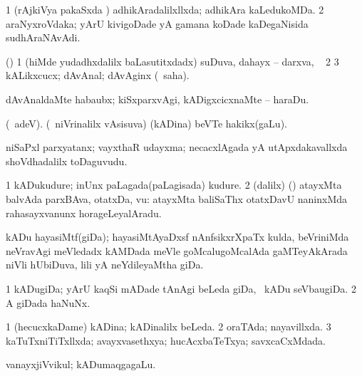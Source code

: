 {{{{{{\noindent
\gl{\pagu}
\expl{}
\bmng
\bnum
\num{1}  (rAjkiVya pakaSxda \vi) adhikAradalilxllxda; adhikAra kaLedukoMDa. 
\num{2}  araNyxroVdaka; yArU kivigoDade yA gamana koDade kaDegaNisida sudhAraNAvAdi. 
\enum
\emng
\eentry

\bentry
{} 
\gl{\nA}
\expl{}
\bmng
(\ca) 
\bnum
\num{1} (hiMde yudadhxdalilx baLasutitxdadx) suDuva, dahayx -- darxva, \kanmu\  
\num{2} 
\num{3} kALikxcucx; dAvAnal; dAvAginx (\rUpa\ saha). 
\enum
\emng

\noindent
\gl{\pagu}
\bmng
{} dAvAnaldaMte habaubx; kiSxparxvAgi, kADigxcicxnaMte -- haraDu. 
\emng
\eentry

\bentry
{} 
\gl{\nA}
\expl{}
\bmng
(\bava\ adeV). (\kanmu\ niVrinalilx vAsisuva) (kADina) beVTe hakikx(gaLu). 
\emng
\eentry

\bentry
{}
\gl{\nA}
\bmng
niSaPxl parxyatanx; vayxthaR udayxma; necacxlAgada yA utApxdakavallxda shoVdhadalilx toDaguvudu. 
\emng
\eentry

\bentry
{} 
\gl{\nA}
\expl{}
\bmng
\bnum
\num{1} kADukudure; inUnx paLagada(paLagisada) kudure. 
\num{2} (\bava dalilx) (\AmA) atayxMta balvAda parxBAva, otatxDa, \mo vu:  atayxMta baliSaThx otatxDavU naninxMda rahasayxvanunx horageLeyalAradu. 
\enum
\emng
\eentry

\bentry
{}
 \gl{\nA}\bmng
kADu hayasiMtf(giDa); hayasiMtAyaDxsf nAnfsikxrXpaTx kulda, beVriniMda neVravAgi meVledadx kAMDada meVle goMcalugoMcalAda gaMTeyAkArada niVli hUbiDuva, lili yA neYdileyaMtha giDa. 
\emng
\eentry

\bentry
{}
  \gl{\nA}\bmng
\bnum
\num{1} kADugiDa; yArU kaqSi mADade tAnAgi beLeda giDa, \kanmu\ kADu seVbaugiDa. 
\num{2} A giDada haNuNx. 
\enum
\emng
\eentry

\bentry
{}
  \gl{\gu}\bmng
\bnum
\num{1} (hecucxkaDame) kADina; kADinalilx beLeda. 
\num{2} oraTAda; nayavillxda. 
\num{3} kaTuTxniTiTxllxda; avayxvasethxya; hucAcxbaTeTxya; savxcaCxMdada. 
\enum
\emng
\eentry

\bentry
{} 
\gl{\nA}
\expl{}
\bmng
vanayxjiVvikul; kADumaqgagaLu. 
\emng
\eentry

}}}}}}
